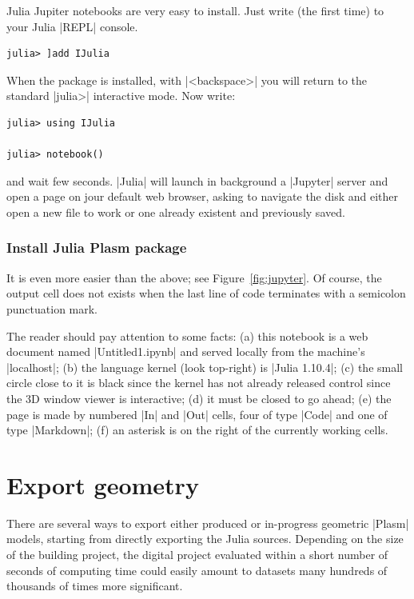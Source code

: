 \begin{coding}
Julia Jupiter notebooks are very easy to install. 
Just write (the first time) to your Julia |REPL| console. 

\begin{lstlisting}[language=JuliaLocal, style=julia, mathescape=true]
julia> ]add IJulia 
\end{lstlisting}

When the package is installed, with |<backspace>| you will return to the standard |julia>| interactive mode.  Now write:

\begin{lstlisting}[language=JuliaLocal, style=julia, mathescape=true]
julia> using IJulia   

julia> notebook()
\end{lstlisting}
and wait few seconds. |Julia| will launch in background a |Jupyter| server and open a page on jour default web browser, asking to navigate the disk and either open a new file to work or one already existent and previously saved.


\subsubsection*{Install Julia Plasm package}\label{sect:4-5-1}

It is even more easier than the above; see Figure~\ref{fig:jupyter}. Of course, the output cell does not exists when the last line of code  terminates with a semicolon punctuation mark.

The reader should pay attention to some facts: (a) this notebook is a web document named |Untitled1.ipynb| and served locally from the machine’s |localhost|; (b) the language kernel (look top-right) is |Julia 1.10.4|; (c) the small circle close to it is black since the kernel has not already released control since the 3D window viewer is interactive; (d) it must be closed to go ahead; (e) the page is made by numbered |In| and |Out| cells, four of type |Code| and one of type |Markdown|; (f) an asterisk is on the right of the currently working cells.

\section{Export geometry}\label{sect:4-6}

There are several ways to export either produced or in-progress geometric |Plasm| models, starting from directly exporting the Julia sources. Depending on the size of the building project, the digital project evaluated within a short number of seconds of computing time could easily amount to datasets many hundreds of thousands of times more significant. 


\end{coding}

